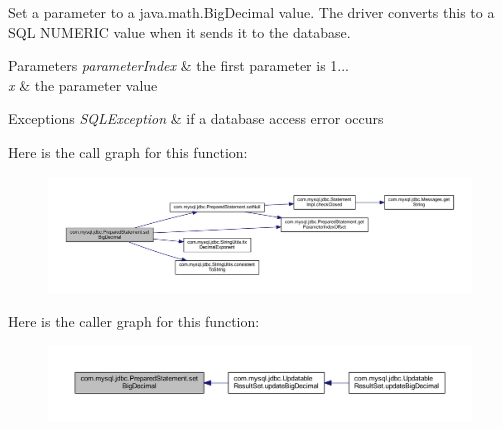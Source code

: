 Set a parameter to a java.\+math.\+Big\+Decimal value. The driver converts this to a S\+QL N\+U\+M\+E\+R\+IC value when it sends it to the database.


\begin{DoxyParams}{Parameters}
{\em parameter\+Index} & the first parameter is 1... \\
\hline
{\em x} & the parameter value\\
\hline
\end{DoxyParams}

\begin{DoxyExceptions}{Exceptions}
{\em S\+Q\+L\+Exception} & if a database access error occurs \\
\hline
\end{DoxyExceptions}
Here is the call graph for this function\+:
\nopagebreak
\begin{figure}[H]
\begin{center}
\leavevmode
\includegraphics[width=350pt]{classcom_1_1mysql_1_1jdbc_1_1_prepared_statement_ab398b97a7a8e7b77fa5d2ad422897cd7_cgraph}
\end{center}
\end{figure}
Here is the caller graph for this function\+:
\nopagebreak
\begin{figure}[H]
\begin{center}
\leavevmode
\includegraphics[width=350pt]{classcom_1_1mysql_1_1jdbc_1_1_prepared_statement_ab398b97a7a8e7b77fa5d2ad422897cd7_icgraph}
\end{center}
\end{figure}
\mbox{\label{classcom_1_1mysql_1_1jdbc_1_1_prepared_statement_a230dbbbaa17cdab8c8a70125a6b8bbca}} 
